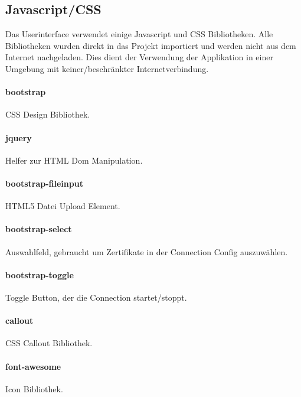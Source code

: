 \subsection{Javascript/CSS}
Das Userinterface verwendet einige Javascript und CSS Bibliotheken. Alle Bibliotheken wurden direkt in das Projekt importiert und werden nicht aus dem Internet nachgeladen. Dies dient der Verwendung der Applikation in einer Umgebung mit keiner/beschränkter Internetverbindung.

\paragraph{bootstrap} \cite{bootstrap} CSS Design Bibliothek.
\paragraph{jquery} \cite{jquery} Helfer zur HTML Dom Manipulation.
\paragraph{bootstrap-fileinput} \cite{bootstrap-fileinput} HTML5 Datei Upload Element.
\paragraph{bootstrap-select} \cite{bootstrap-select} Auswahlfeld, gebraucht um Zertifikate in der Connection Config auszuwählen.
\paragraph{bootstrap-toggle} \cite{bootstrap-toggle} Toggle Button, der die Connection startet/stoppt.
\paragraph{callout} \cite{callout} CSS Callout Bibliothek.
\paragraph{font-awesome} \cite{fontawesome} Icon Bibliothek.